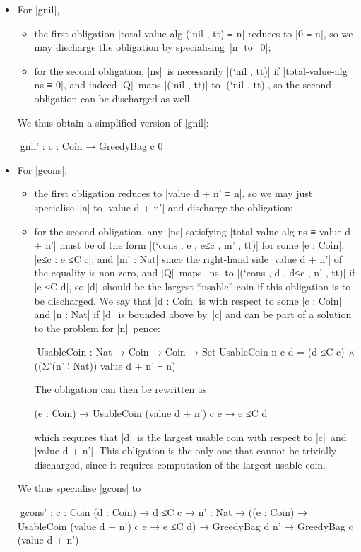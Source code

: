\begin{itemize}
\item For |gnil|,
\begin{itemize}
\item the first obligation |total-value-alg (`nil , tt) ≡ n| reduces to |0 ≡ n|, so we may discharge the obligation by specialising~|n| to~|0|;
\item for the second obligation, |ns|~is necessarily |(`nil , tt)| if |total-value-alg ns ≡ 0|, and indeed |Q|~maps |(`nil , tt)| to |(`nil , tt)|, so the second obligation can be discharged as well.
\end{itemize}
We thus obtain a simplified version of |gnil|:
\begin{code}
^^^gnil' : {c : Coin} → GreedyBag c 0
\end{code}
\item For |gcons|,
\begin{itemize}
\item the first obligation reduces to |value d + n' ≡ n|, so we may just specialise~|n| to |value d + n'| and discharge the obligation;
\item for the second obligation, any~|ns| satisfying |total-value-alg ns ≡ value d + n'| must be of the form |(`cons , e , e≤c , m' , tt)| for some |e : Coin|, |e≤c : e ≤C c|, and |m' : Nat| since the right-hand side |value d + n'| of the equality is non-zero, and |Q|~maps~|ns| to |(`cons , d , d≤c , n' , tt)| if |e ≤C d|, so |d|~should be the largest ``usable'' coin if this obligation is to be discharged.
We say that |d : Coin| is  with respect to some |c : Coin| and |n : Nat| if |d|~is bounded above by~|c| and can be part of a solution to the problem for |n|~pence:
\begin{code}
^^^UsableCoin : Nat → Coin → Coin → Set
UsableCoin n c d = (d ≤C c) × ((Σ'(n' ∶ Nat)) value d + n' ≡ n)
\end{code}
The obligation can then be rewritten as
\begin{code}
(e : Coin) → UsableCoin (value d + n') c e → e ≤C d
\end{code}
which requires that |d|~is the largest usable coin with respect to |c|~and |value d + n'|.
This obligation is the only one that cannot be trivially discharged, since it requires computation of the largest usable coin.
\end{itemize}
We thus specialise |gcons| to
\begin{code}
^^^gcons' :  {c : Coin} (d : Coin) → d ≤C c →
             {n' : Nat} →
             ((e : Coin) → UsableCoin (value d + n') c e → e ≤C d) →
             GreedyBag d n' → GreedyBag c (value d + n')
\end{code}
\end{itemize}
